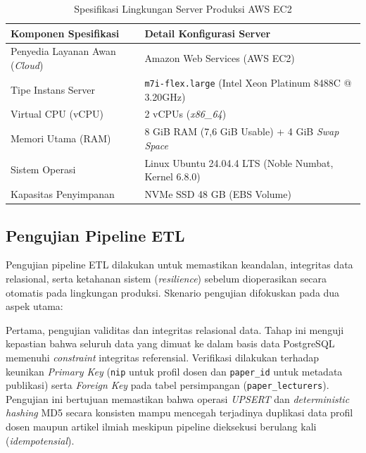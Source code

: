 \documentclass{rapidsart}
\theoremstyle{plain}
\theoremstyle{remark}
\theoremstyle{definition}
\begin{document}
\begin{sloppypar}
    \begin{table}[htbp]
        \caption{Spesifikasi Lingkungan Server Produksi AWS EC2}
        \label{tab:spesifikasi-server}
        \centering
        \begin{tabular}{ll}
            \toprule
            \textbf{Komponen Spesifikasi}          & \textbf{Detail Konfigurasi Server}                            \\
            \midrule
            Penyedia Layanan Awan (\textit{Cloud}) & Amazon Web Services (AWS EC2)                                 \\
            Tipe Instans Server                    & \texttt{m7i-flex.large} (Intel Xeon Platinum 8488C @ 3.20GHz) \\
            Virtual CPU (vCPU)                     & 2 vCPUs (\textit{x86\_64})                                    \\
            Memori Utama (RAM)                     & 8 GiB RAM (7,6 GiB Usable) + 4 GiB \textit{Swap Space}        \\
            Sistem Operasi                         & Linux Ubuntu 24.04.4 LTS (Noble Numbat, Kernel 6.8.0)         \\
            Kapasitas Penyimpanan                  & NVMe SSD 48 GB (EBS Volume)                                   \\
            \bottomrule
        \end{tabular}
    \end{table}

    \subsection{Pengujian Pipeline ETL}
    Pengujian pipeline ETL dilakukan untuk memastikan keandalan, integritas data relasional, serta ketahanan sistem (\textit{resilience}) sebelum dioperasikan secara otomatis pada lingkungan produksi. Skenario pengujian difokuskan pada dua aspek utama:

    Pertama, pengujian validitas dan integritas relasional data. Tahap ini menguji kepastian bahwa seluruh data yang dimuat ke dalam basis data PostgreSQL memenuhi \textit{constraint} integritas referensial. Verifikasi dilakukan terhadap keunikan \textit{Primary Key} (\texttt{nip} untuk profil dosen dan \texttt{paper\_id} untuk metadata publikasi) serta \textit{Foreign Key} pada tabel persimpangan (\texttt{paper\_lecturers}). Pengujian ini bertujuan memastikan bahwa operasi \textit{UPSERT} dan \textit{deterministic hashing} MD5 secara konsisten mampu mencegah terjadinya duplikasi data profil dosen maupun artikel ilmiah meskipun pipeline dieksekusi berulang kali (\textit{idempotensial}).


\end{sloppypar}
\end{document}
